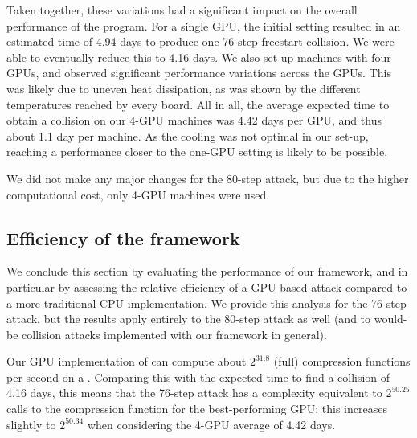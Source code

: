 Taken together, these variations had a significant impact on the overall performance of the program. For a single GPU, the initial setting resulted in an estimated
time of 4.94 days to produce one 76-step freestart collision. We were able to eventually reduce this to 4.16 days. We also set-up machines with four GPUs, and observed significant
performance variations across the GPUs. This was likely due to uneven heat dissipation, as was shown by the different temperatures reached by every board. All in all, the
average expected time to obtain a collision on our 4-GPU machines was 4.42 days per GPU, and thus about 1.1 day per machine. As the cooling was not optimal in our set-up,
reaching a performance closer to the one-GPU setting is likely to be possible.

We did not make any major changes for the 80-step attack, but due to the higher computational cost, only 4-GPU machines were used.

\FloatBarrier

\subsection{Efficiency of the framework}
\label{sec:effi_fw}

We conclude this section by evaluating the performance of our framework, and in particular by assessing the relative efficiency of a GPU-based attack compared to a more traditional CPU implementation.
We provide this analysis for the 76-step attack, but the results apply entirely to the 80-step attack as well (and to would-be \shaone collision attacks implemented with our framework in general).


Our GPU implementation of \shaone can compute about $2^{31.8}$ (full) \shaone compression functions per second on a \gtx.
Comparing this with the expected time to find a collision of 4.16 days, this means that the 76-step attack has a complexity equivalent to $2^{50.25}$ calls to the compression function for the
best-performing GPU; this increases slightly to $2^{50.34}$ when considering the 4-GPU average of 4.42 days.

